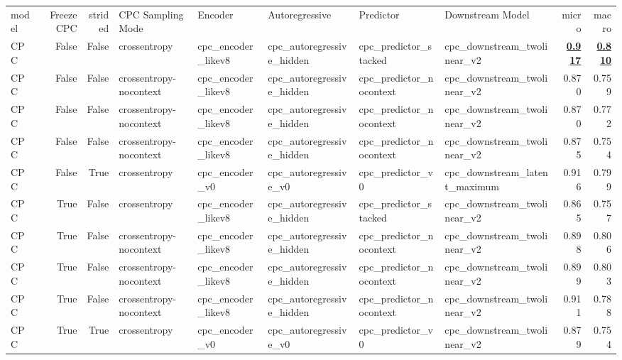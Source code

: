 \begin{adjustbox}{width=\textwidth}
\begin{tabular}{lrrlllllrr}
{model} & {Freeze CPC} & {strided} & {CPC Sampling Mode} & {Encoder} & {Autoregressive} & {Predictor} & {Downstream Model} & {micro} & {macro} \\
CPC & False & False & crossentropy & cpc\_encoder\_likev8 & cpc\_autoregressive\_hidden & cpc\_predictor\_stacked & cpc\_downstream\_twolinear\_v2 & \bfseries \underline{0.917} & \bfseries \underline{0.810} \\
CPC & False & False & crossentropy-nocontext & cpc\_encoder\_likev8 & cpc\_autoregressive\_hidden & cpc\_predictor\_nocontext & cpc\_downstream\_twolinear\_v2 & 0.870 & 0.759 \\
CPC & False & False & crossentropy-nocontext & cpc\_encoder\_likev8 & cpc\_autoregressive\_hidden & cpc\_predictor\_nocontext & cpc\_downstream\_twolinear\_v2 & 0.870 & 0.772 \\
CPC & False & False & crossentropy-nocontext & cpc\_encoder\_likev8 & cpc\_autoregressive\_hidden & cpc\_predictor\_nocontext & cpc\_downstream\_twolinear\_v2 & 0.875 & 0.754 \\
CPC & False & True & crossentropy & cpc\_encoder\_v0 & cpc\_autoregressive\_v0 & cpc\_predictor\_v0 & cpc\_downstream\_latent\_maximum & 0.916 & 0.799 \\
CPC & True & False & crossentropy & cpc\_encoder\_likev8 & cpc\_autoregressive\_hidden & cpc\_predictor\_stacked & cpc\_downstream\_twolinear\_v2 & 0.865 & 0.757 \\
CPC & True & False & crossentropy-nocontext & cpc\_encoder\_likev8 & cpc\_autoregressive\_hidden & cpc\_predictor\_nocontext & cpc\_downstream\_twolinear\_v2 & 0.898 & 0.806 \\
CPC & True & False & crossentropy-nocontext & cpc\_encoder\_likev8 & cpc\_autoregressive\_hidden & cpc\_predictor\_nocontext & cpc\_downstream\_twolinear\_v2 & 0.899 & 0.803 \\
CPC & True & False & crossentropy-nocontext & cpc\_encoder\_likev8 & cpc\_autoregressive\_hidden & cpc\_predictor\_nocontext & cpc\_downstream\_twolinear\_v2 & 0.911 & 0.788 \\
CPC & True & True & crossentropy & cpc\_encoder\_v0 & cpc\_autoregressive\_v0 & cpc\_predictor\_v0 & cpc\_downstream\_twolinear\_v2 & 0.879 & 0.754 \\
\end{tabular}
\end{adjustbox}